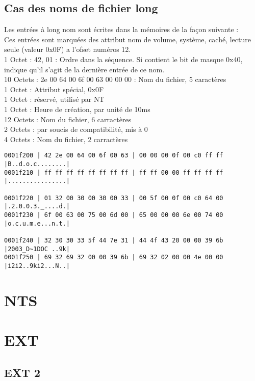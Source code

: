 \documentclass[11pt]{report}
\begin{document}
\section{Cas des noms de fichier long}
Les entrées à long nom sont écrites dans la mémoires de la façon suivante : \\
Ces entrées sont marquées des attribut nom de volume, système, caché, lecture seule (valeur 0x0F) a l'ofset numéros 12.\\
1 Octet : 42, 01 : Ordre dans la séquence. Si contient le bit de masque 0x40, indique qu'il s'agit de la dernière entrée de ce nom. \\
10 Octets : 2e 00 64 00 6f 00 63 00 00 00 : Nom du fichier, 5 caractères\\
1 Octet : Attribut spécial, 0x0F\\
1 Octet : réservé, utilisé par NT\\
1 Octet : Heure de création, par unité de 10ms\\
12 Octets : Nom du fichier, 6 carractères\\
2 Octets : par soucis de compatibilité, mis à 0 \\
4 Octets : Nom du fichier, 2 carractères\\
\begin{verbatim}
0001f200 | 42 2e 00 64 00 6f 00 63 | 00 00 00 0f 00 c0 ff ff    |B..d.o.c........|
0001f210 | ff ff ff ff ff ff ff ff | ff ff 00 00 ff ff ff ff    |................|

0001f220 | 01 32 00 30 00 30 00 33 | 00 5f 00 0f 00 c0 64 00    |.2.0.0.3._....d.|
0001f230 | 6f 00 63 00 75 00 6d 00 | 65 00 00 00 6e 00 74 00    |o.c.u.m.e...n.t.|

0001f240 | 32 30 30 33 5f 44 7e 31 | 44 4f 43 20 00 00 39 6b    |2003_D~1DOC ..9k|
0001f250 | 69 32 69 32 00 00 39 6b | 69 32 02 00 00 4e 00 00    |i2i2..9ki2...N..|
\end{verbatim}
\chapter{NTS}

\chapter{EXT}

\section{EXT 2}
\end{document}
